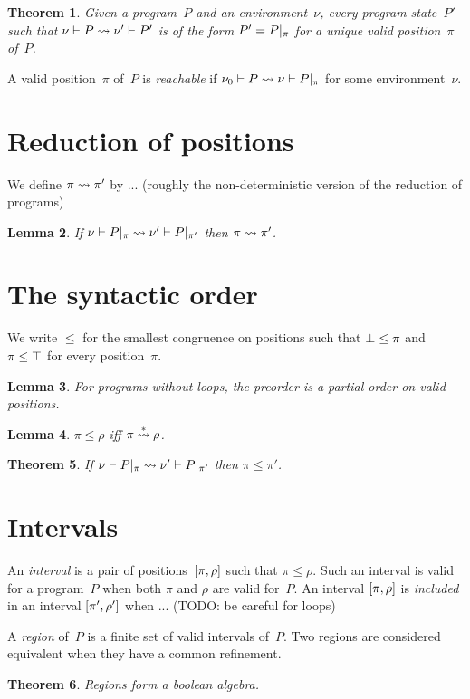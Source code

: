 \documentclass[a4paper]{article}
\theoremstyle{theorem}
\newtheorem{theorem}{Theorem}
\newtheorem{lemma}[theorem]{Lemma}
\theoremstyle{example}
\theoremstyle{remark}
\begin{document}
\begin{theorem}
  Given a program~$P$ and an environment~$\nu$, every program state~$P'$ such
  that $\penv\nu P\redto\penv{\nu'}{P'}$ is of the form $P'=\postate\pi P$ for a
  unique valid position~$\pi$ of~$P$.
\end{theorem}

\noindent
A valid position~$\pi$ of~$P$ is \emph{reachable} if
$\penv{\nu_0} P\redto\penv\nu{\postate\pi P}$ for some environment~$\nu$.

\section{Reduction of positions}
We define $\pi\redto\pi'$ by ... (roughly the non-deterministic version of the
reduction of programs)

\begin{lemma}
  If $\penv\nu{\postate\pi P}\redto\penv{\nu'}{\postate{\pi'}P}$ then $\pi\redto\pi'$.
\end{lemma}

\section{The syntactic order}
We write $\leq$ for the smallest congruence on positions such that
$\pbot\leq\pi$ and $\pi\leq\ptop$ for every position~$\pi$.

\begin{lemma}
  For programs without loops, the preorder is a partial order on valid
  positions.
\end{lemma}

\begin{lemma}
  $\pi\leq\rho$ iff $\pi\overset*\redto\rho$.
\end{lemma}

\begin{theorem}
  If $\penv\nu{\postate\pi P}\redto\penv{\nu'}{\postate{\pi'}P}$ then
  $\pi\leq\pi'$.
\end{theorem}

\section{Intervals}
An \emph{interval} is a pair of positions~$\intv\pi\rho$ such that
$\pi\leq\rho$. Such an interval is valid for a program~$P$ when both $\pi$ and
$\rho$ are valid for~$P$. An interval $\intv\pi\rho$ is \emph{included} in an
interval $\intv{\pi'}{\rho'}$ when ... (TODO: be careful for loops)

A \emph{region} of~$P$ is a finite set of valid intervals of~$P$. Two regions
are considered equivalent when they have a common refinement.

\begin{theorem}
  Regions form a boolean algebra.
\end{theorem}
\end{document}

